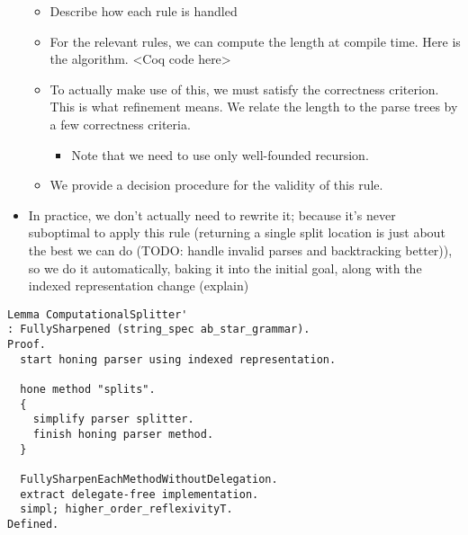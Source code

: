 \begin{itemize}
\begin{itemize}
    \item  Describe how each rule is handled 
    \item  For the relevant rules, we can compute the length at compile time.  Here is the algorithm. <Coq code here> 
    \item  To actually make use of this, we must satisfy the correctness criterion.  This is what refinement means.  We relate the length to the parse trees by a few correctness criteria. 
      \begin{itemize} \item  Note that we need to use only well-founded recursion. \end{itemize} 
    \item  We provide a decision procedure for the validity of this rule. \end{itemize}
  \item  In practice, we don't actually need to rewrite it; because it's never suboptimal to apply this rule (returning a single split location is just about the best we can do (TODO: handle invalid parses and backtracking better)), so we do it automatically, baking it into the initial goal, along with the indexed representation change (explain) \end{itemize}
  
\begin{verbatim}
Lemma ComputationalSplitter'
: FullySharpened (string_spec ab_star_grammar).
Proof.
  start honing parser using indexed representation.

  hone method "splits".
  {
    simplify parser splitter.
    finish honing parser method.
  }

  FullySharpenEachMethodWithoutDelegation.
  extract delegate-free implementation.
  simpl; higher_order_reflexivityT.
Defined.
\end{verbatim}

